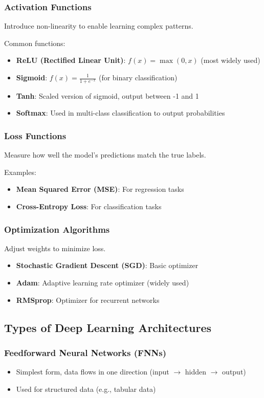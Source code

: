 \subsubsection{Activation Functions}
Introduce non-linearity to enable learning complex patterns.

Common functions:
\begin{itemize}
	\item \textbf{ReLU (Rectified Linear Unit)}: $f(x) = \max(0, x)$ (most widely used)
	\item \textbf{Sigmoid}: $f(x) = \frac{1}{1 + e^{-x}}$ (for binary classification)
	\item \textbf{Tanh}: Scaled version of sigmoid, output between -1 and 1
	\item \textbf{Softmax}: Used in multi-class classification to output probabilities
\end{itemize}

\subsubsection{Loss Functions}
Measure how well the model's predictions match the true labels.

Examples:
\begin{itemize}
	\item \textbf{Mean Squared Error (MSE)}: For regression tasks
	\item \textbf{Cross-Entropy Loss}: For classification tasks
\end{itemize}

\subsubsection{Optimization Algorithms}
Adjust weights to minimize loss.
\begin{itemize}
	\item \textbf{Stochastic Gradient Descent (SGD)}: Basic optimizer
	\item \textbf{Adam}: Adaptive learning rate optimizer (widely used)
	\item \textbf{RMSprop}: Optimizer for recurrent networks
\end{itemize}

\subsection{Types of Deep Learning Architectures}
\subsubsection{Feedforward Neural Networks (FNNs)}
\begin{itemize}
	\item Simplest form, data flows in one direction (input $\rightarrow$ hidden $\rightarrow$ output)
	\item Used for structured data (e.g., tabular data)
\end{itemize}

